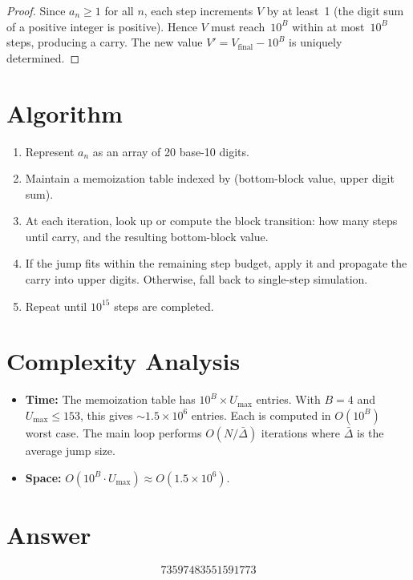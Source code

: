 \documentclass[11pt]{article}
\begin{document}
\begin{proof}
Since $a_n \geq 1$ for all $n$, each step increments $V$ by at least~1 (the digit sum of a positive integer is positive). Hence $V$ must reach~$10^B$ within at most~$10^B$ steps, producing a carry. The new value $V' = V_{\text{final}} - 10^B$ is uniquely determined.
\end{proof}

\section{Algorithm}

\begin{enumerate}
\item Represent $a_n$ as an array of 20 base-10 digits.
\item Maintain a memoization table indexed by (bottom-block value, upper digit sum).
\item At each iteration, look up or compute the block transition: how many steps until carry, and the resulting bottom-block value.
\item If the jump fits within the remaining step budget, apply it and propagate the carry into upper digits. Otherwise, fall back to single-step simulation.
\item Repeat until $10^{15}$ steps are completed.
\end{enumerate}

\section{Complexity Analysis}

\begin{itemize}
\item \textbf{Time:} The memoization table has $10^B \times U_{\max}$ entries. With $B = 4$ and $U_{\max} \leq 153$, this gives ${\sim}1.5 \times 10^6$ entries. Each is computed in $O(10^B)$ worst case. The main loop performs $O(N / \bar{\Delta})$ iterations where $\bar{\Delta}$ is the average jump size.
\item \textbf{Space:} $O(10^B \cdot U_{\max}) \approx O(1.5 \times 10^6)$.
\end{itemize}

\section{Answer}

\[
\boxed{73597483551591773}
\]
\end{document}
